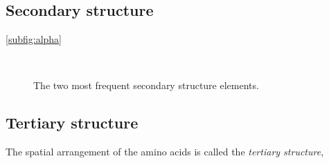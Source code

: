 \subsection{Secondary structure}
\ref{subfig:alpha}
\begin{figure}[hb]
	\centering
	\\
	\caption{The two most frequent secondary structure elements.}\label{fig:alpha_beta}
\end{figure}


\subsection{Tertiary structure}
The spatial arrangement of the amino acids is called the \emph{tertiary structure},

